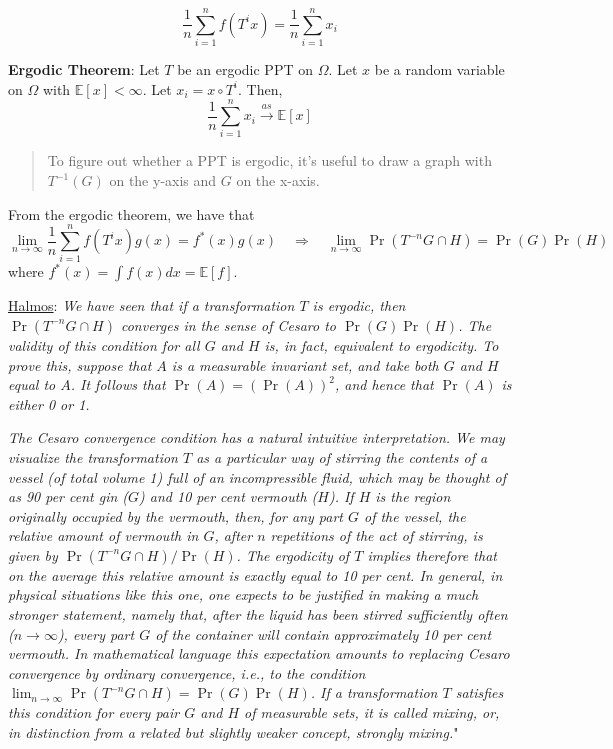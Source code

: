 \documentclass[12pt,]{book}
\begin{document}
\[
    \frac{1}{n} \sum _ {i=1}^n f(T^{i}x) = \frac{1}{n} \sum _ {i=1}^n x_i 
\]

\textbf{Ergodic Theorem}:
Let \(T\) be an ergodic PPT on \(\Omega\). Let \(x\) be a random variable on \(\Omega\) with \(\mathbb{E}[x] < \infty\). Let \(x_i = x \circ T^i\). Then,
\[
        \frac{1}{n} \sum _ {i=1}^n x_i \overset{as}{\to} \mathbb{E}[x]
\]

\begin{quote}
To figure out whether a PPT is ergodic, it's useful to draw a graph with \(T^{-1}(G)\) on the y-axis and \(G\) on the x-axis.
\end{quote}

From the ergodic theorem, we have that
\[
    \lim _ {n \to \infty} \frac{1}{n} \sum _ {i=1}^n f(T^{i}x) g(x) = f^* (x)g(x) \quad \Rightarrow \quad  \lim _ {n \to \infty} \Pr(T^{-n}G \cap H) = \Pr(G)\Pr(H)
\]
where \(f^* (x) = \int f(x) dx = \mathbb{E}[f]\).

\href{}{Halmos}: \emph{We have seen that if a transformation \(T\) is ergodic, then \(\Pr(T^{-n}G \cap H)\) converges in the sense of Cesaro to \(\Pr(G)\Pr(H)\). The validity of this condition for all \(G\) and \(H\) is, in fact, equivalent to ergodicity. To prove this, suppose that \(A\) is a measurable invariant set, and take both \(G\) and \(H\) equal to \(A\). It follows that \(\Pr(A) = (\Pr(A))^2\), and hence that \(\Pr(A)\) is either 0 or 1.}

\emph{The Cesaro convergence condition has a natural intuitive interpretation. We may visualize the transformation \(T\) as a particular way of stirring the contents of a vessel (of total volume 1) full of an incompressible fluid, which may be thought of as 90 per cent gin (\(G\)) and 10 per cent vermouth (\(H\)). If \(H\) is the region originally occupied by the vermouth, then, for any part \(G\) of the vessel, the relative amount of vermouth in \(G\), after \(n\) repetitions of the act of stirring, is given by \(\Pr(T^{-n}G \cap H)/\Pr(H)\). The ergodicity of \(T\) implies therefore that on the average this relative amount is exactly equal to 10 per cent. In general, in physical situations like this one, one expects to be justified in making a much stronger statement, namely that, after the liquid has been stirred sufficiently often (\(n \to \infty\)), every part \(G\) of the container will contain approximately 10 per cent vermouth. In mathematical language this expectation amounts to replacing Cesaro convergence by ordinary convergence, i.e., to the condition \(\lim_ {n\to \infty} \Pr(T^{-n}G \cap H) = \Pr(G)\Pr(H)\). If a transformation \(T\) satisfies this condition for every pair \(G\) and \(H\) of measurable sets, it is called mixing, or, in distinction from a related but slightly weaker concept, strongly mixing.}"
\end{document}
